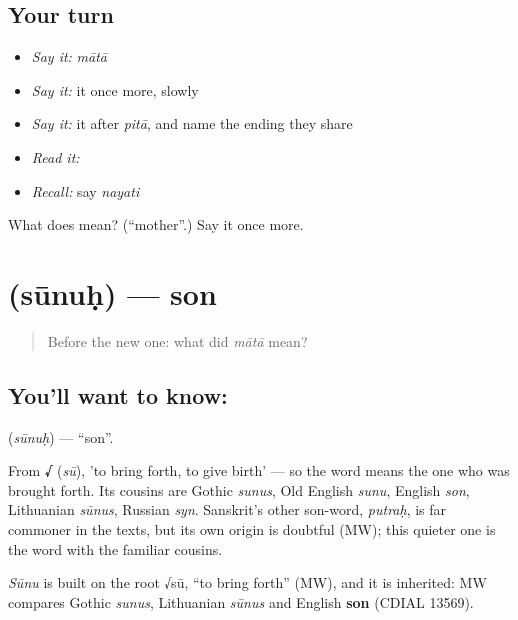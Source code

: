 \subsection*{Your turn}
\begin{itemize}
\raggedright
  \item \emph{Say it:} \emph{mātā}
  \item \emph{Say it:} it once more, slowly
  \item \emph{Say it:} it after \emph{pitā}, and name the ending they share
  \item \emph{Read it:} \textbf{}
  \item \emph{Recall:} say \emph{nayati}
\end{itemize}

\begin{tcolorbox}[breakable,colback=teal!4,colframe=teal!35!black,title={Before you move on}]
What does  mean? (\textquotedblleft{}mother\textquotedblright{}.) Say it once more.
\end{tcolorbox}
\section[\texorpdfstring{\sk{सूनुः} (sūnuḥ)}{सूनुः (sūnuḥ)}]{ (sūnuḥ) — son}

\label{lesson:SA-C23-son}



\begin{quote}
Before the new one: what did \emph{mātā} mean?
\end{quote}

\subsection*{You'll want to know: }
\textbf{} (\emph{sūnuḥ}) — \textquotedblleft{}son\textquotedblright{}.

From \textbf{√} (\emph{sū}), 'to bring forth, to give birth' — so the word means the one who was brought forth. Its cousins are Gothic \emph{sunus}, Old English \emph{sunu}, English \emph{son}, Lithuanian \emph{sūnus}, Russian \emph{syn}. Sanskrit's other son-word, \emph{putraḥ}, is far commoner in the texts, but its own origin is doubtful (MW); this quieter one is the word with the familiar cousins.

\begin{cousinweb}
\emph{Sūnu} is built on the root √sū, \textquotedblleft{}to bring forth\textquotedblright{} (MW), and it is inherited: MW compares Gothic \emph{sunus}, Lithuanian \emph{sūnus} and English \textbf{son} (CDIAL 13569).
\end{cousinweb}

